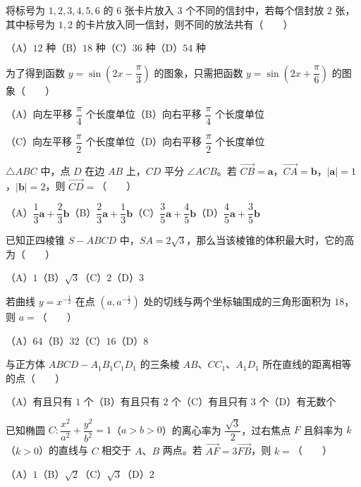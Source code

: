 \begin{question}
将标号为 $1,2,3,4,5,6$ 的 $6$ 张卡片放入 $3$ 个不同的信封中，若每个信封放 $2$ 张，其中标号为 $1,2$ 的卡片放入同一信封，则不同的放法共有\mbox{（　　）}

（A）$12$ 种\quad（B）$18$ 种\quad（C）$36$ 种\quad（D）$54$ 种

\end{question}
\begin{question}
为了得到函数 $y=\sin\left(2x-\dfrac\pi3\right)$ 的图象，只需把函数 $y=\sin\left(2x+\dfrac\pi6\right)$ 的图象\mbox{（　　）}

（A）向左平移 $\dfrac\pi4$ 个长度单位\quad（B）向右平移 $\dfrac\pi4$ 个长度单位

（C）向左平移 $\dfrac\pi2$ 个长度单位\quad（D）向右平移 $\dfrac\pi2$ 个长度单位

\end{question}
\begin{question}
$\triangle ABC$ 中，点 $D$ 在边 $AB$ 上，$CD$ 平分 $\angle ACB$。若 $\overrightarrow{CB}=\boldsymbol a$，$\overrightarrow{CA}=\boldsymbol b$，$|\boldsymbol a|=1$，$|\boldsymbol b|=2$，则 $\overrightarrow{CD}=$\mbox{（　　）}

（A）$\dfrac13\boldsymbol a+\dfrac23\boldsymbol b$\quad（B）$\dfrac23\boldsymbol a+\dfrac13\boldsymbol b$\quad（C）$\dfrac35\boldsymbol a+\dfrac45\boldsymbol b$\quad（D）$\dfrac45\boldsymbol a+\dfrac35\boldsymbol b$

\end{question}
\begin{question}
已知正四棱锥 $S-ABCD$ 中，$SA=2\sqrt3$，那么当该棱锥的体积最大时，它的高为\mbox{（　　）}

（A）$1$\quad（B）$\sqrt3$\quad（C）$2$\quad（D）$3$

\end{question}
\begin{question}
若曲线 $y=x^{-\frac12}$ 在点 $\left(a,a^{-\frac12}\right)$ 处的切线与两个坐标轴围成的三角形面积为 $18$，则 $a=$\mbox{（　　）}

（A）$64$\quad（B）$32$\quad（C）$16$\quad（D）$8$

\end{question}
\begin{question}
与正方体 $ABCD-A_1B_1C_1D_1$ 的三条棱 $AB\text{、}CC_1\text{、}A_1D_1$ 所在直线的距离相等的点\mbox{（　　）}

（A）有且只有 $1$ 个\quad（B）有且只有 $2$ 个\quad（C）有且只有 $3$ 个\quad（D）有无数个

\end{question}
\begin{question}
已知椭圆 $C:\dfrac{x^2}{a^2}+\dfrac{y^2}{b^2}=1$（$a>b>0$）的离心率为 $\dfrac{\sqrt3}{2}$，过右焦点 $F$ 且斜率为 $k$（$k>0$）的直线与 $C$ 相交于 $A\text{、}B$ 两点。若 $\overrightarrow{AF}=3\overrightarrow{FB}$，则 $k=$\mbox{（　　）}

（A）$1$\quad（B）$\sqrt2$\quad（C）$\sqrt3$\quad（D）$2$

\end{question}

